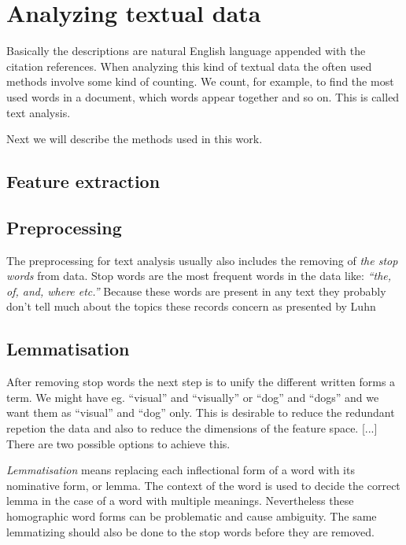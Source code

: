 

 
\section{Analyzing textual data}
Basically the descriptions are natural English 
language appended with the citation references. When analyzing 
this kind of textual data the often used methods involve some 
kind of counting. We count, for example, to find the most used 
words in a document, which words appear together and so on.
This is called text analysis. 


Next we will describe the methods used in this work.
\subsection{Feature extraction}



\subsection{Preprocessing}
The preprocessing for text analysis usually also includes the 
removing of \emph{the stop words} from data. Stop words are the 
most frequent words in the data like: \emph{``the, of, and, where 
etc.''} Because these words are present in any text they probably 
don't tell much about the topics these records concern as 
presented by Luhn \cite{luhn_key_1960}


\subsection{Lemmatisation}
After removing stop words the next step is to unify the 
different written forms a term. We might have eg. ``visual'' 
and ``visually'' or ``dog'' and ``dogs'' and we want them as 
``visual'' and ``dog'' only. This is desirable to reduce the 
redundant repetion the data and also to reduce the dimensions of 
the feature space. [...] \cite{siemens_lemmatization_1996} 
\cite{hann_towards_1975}
There are two possible options to achieve this. 

\emph{Lemmatisation} means replacing each inflectional form of a 
word with its nominative form, or lemma. The context of the word 
is used to decide the correct lemma in the case of a word with 
multiple meanings.   Nevertheless these homographic 
word forms can be problematic and cause ambiguity. The same 
lemmatizing should also be done to the stop words before they are 
removed.


